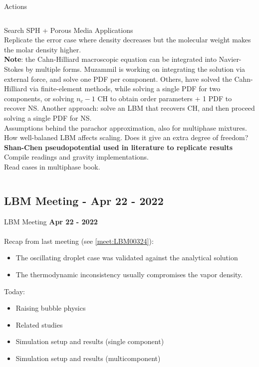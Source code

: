\documentclass[8pt]{beamer}
\begin{document}
	\begin{frame}{Actions}
		\begin{columns}
			
			Search SPH + Porous Media Applications\\
			Replicate the error case where density decreases but the molecular weight makes the molar density higher.\\
			\textbf{Note}: the Cahn-Hilliard macroscopic equation can be integrated into Navier-Stokes by multiple forms. Muzammil is working on integrating the solution via external force, and solve one PDF per component. Others, have solved the Cahn-Hilliard via finite-element methods, while solving a single PDF for two components, or solving $n_c-1$ CH to obtain order parameters + 1 PDF to recover NS. Another approach: solve an LBM that recovers CH, and then proceed solving a single PDF for NS.\\
			
			Assumptions behind the parachor approximation, also for multiphase mixtures.\\
			How well-balaned LBM affects scaling. Does it give an extra degree of freedom?\\
			\textbf{Shan-Chen pseudopotential used in literature to replicate results}\\
			Compile readings and gravity implementations.\\
			Read cases in multiphase book.
			
			
		\end{columns}
	\end{frame}
	
	\subsection{LBM Meeting - Apr 22 - 2022}
	\label{}
	\justifying
	\begin{frame}{LBM Meeting}
		\textbf{Apr 22 - 2022}\\~\\
		Recap from last meeting (see \ref{meet:LBM00324}):
		\begin{itemize}
			\item The oscillating droplet case was validated against the analytical solution
			\item The thermodynamic inconsistency usually compromises the vapor density.
		\end{itemize}
		
		Today:
		\begin{itemize}
			\item Raising bubble physics
			\item Related studies
			\item Simulation setup and results (single component)
			\item Simulation setup and results (multicomponent)
		\end{itemize}
	\end{frame}
	
\end{document}
